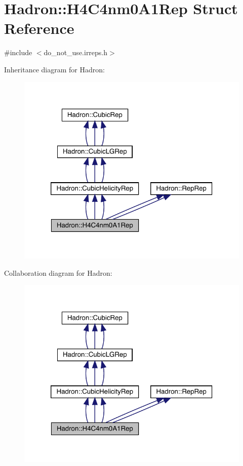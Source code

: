 \hypertarget{structHadron_1_1H4C4nm0A1Rep}{}\section{Hadron\+:\+:H4\+C4nm0\+A1\+Rep Struct Reference}
\label{structHadron_1_1H4C4nm0A1Rep}


{\ttfamily \#include $<$do\+\_\+not\+\_\+use.\+irreps.\+h$>$}



Inheritance diagram for Hadron\+:
\nopagebreak
\begin{figure}[H]
\begin{center}
\leavevmode
\includegraphics[width=320pt]{d1/d7f/structHadron_1_1H4C4nm0A1Rep__inherit__graph}
\end{center}
\end{figure}


Collaboration diagram for Hadron\+:
\nopagebreak
\begin{figure}[H]
\begin{center}
\leavevmode
\includegraphics[width=320pt]{d7/df1/structHadron_1_1H4C4nm0A1Rep__coll__graph}
\end{center}
\end{figure}
